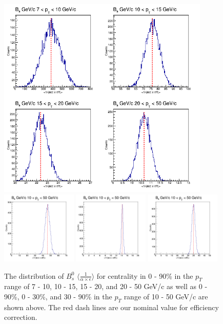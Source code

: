 \begin{figure}[h]
\begin{center}
\includegraphics[width= 0.90\textwidth]{Figures/Chapter4/BsStatSyst_0_90_4BinsPT.png}
\includegraphics[width= 0.32\textwidth]{Figures/Chapter4/BsStatSyst_0_30_1BinsPT.png}
\includegraphics[width= 0.32\textwidth]{Figures/Chapter4/BsStatSyst_30_90_1BinsPT.png}
\includegraphics[width= 0.32\textwidth]{Figures/Chapter4/BsStatSyst_0_90_1BinsPT.png}
\caption{The distribution of $B^0_s$ $\langle \frac{1}{\alpha \times \epsilon} \rangle$ for centrality in 0 - 90\% in the $p_T$ range of 7 - 10, 10 - 15, 15 - 20, and 20 - 50 GeV/c as well as 0 - 90\%, 0 - 30\%, and 30 - 90\% in the $p_T$ range of 10 - 50 GeV/c are shown above. The red dash lines are our nominal value for efficiency correction.}
\label{BsEffStatSyst}
\end{center}
\end{figure}


